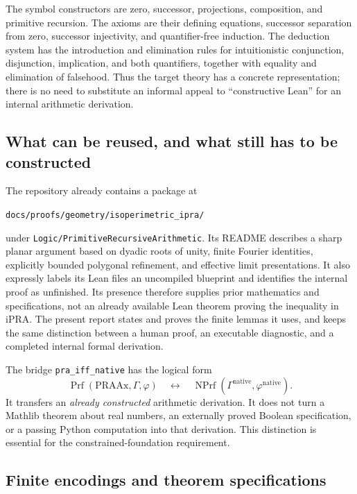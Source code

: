 The symbol constructors are zero, successor, projections, composition,
and primitive recursion.  The axioms are their defining equations,
successor separation from zero, successor injectivity, and quantifier-free
induction.  The deduction system has the introduction and elimination
rules for intuitionistic conjunction, disjunction, implication, and both
quantifiers, together with equality and elimination of falsehood.  Thus the
target theory has a concrete representation; there is no need to substitute
an informal appeal to ``constructive Lean'' for an internal arithmetic
derivation.

\subsection{What can be reused, and what still has to be constructed}

The repository already contains a package at
\begin{center}
\texttt{docs/proofs/geometry/isoperimetric\_ipra/}
\end{center}
under \texttt{Logic/PrimitiveRecursiveArithmetic}.  Its README describes
a sharp planar argument based on dyadic roots of unity, finite Fourier
identities, explicitly bounded polygonal refinement, and effective limit
presentations.  It also expressly labels its Lean files an uncompiled
blueprint and identifies the internal proof as unfinished.  Its presence
therefore supplies prior mathematics and specifications, not an already
available Lean theorem proving the inequality in iPRA.  The present report
states and proves the finite lemmas it uses, and keeps the same distinction
between a human proof, an executable diagnostic, and a completed internal
formal derivation.

The bridge \texttt{pra\_iff\_native} has the logical form
\[
 \operatorname{Prf}(\mathrm{PRAAx},\Gamma,\varphi)
 \quad\longleftrightarrow\quad
 \operatorname{NPrf}(\Gamma^{\mathrm{native}},
                         \varphi^{\mathrm{native}}).
\]
It transfers an \emph{already constructed} arithmetic derivation.  It does
not turn a Mathlib theorem about real numbers, an externally proved Boolean
specification, or a passing Python computation into that derivation.
This distinction is essential for the constrained-foundation requirement.

\subsection{Finite encodings and theorem specifications}

